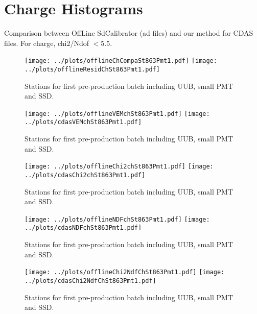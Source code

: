 \documentclass[twoside, final, 10pt]{articleMine}
\begin{document}
\section*{Charge Histograms}
Comparison between OffLine SdCalibrator (ad files) and our method for CDAS files.
For charge, chi2/Ndof $<5.5$.
\clearpage

\begin{figure}[!tbh]
  \centering
  \subfigure
  {
    \texttt{[image: ../plots/offlineChCompaSt863Pmt1.pdf]}
    \texttt{[image: ../plots/offlineResidChSt863Pmt1.pdf]}
  }
  \caption{Stations for first pre-production batch including UUB, small PMT and SSD.}
  \label{figChVemserie}
\end{figure}

\begin{figure}[!tbh]
  \centering
  \subfigure
  {
    \texttt{[image: ../plots/offlineVEMchSt863Pmt1.pdf]}
    \texttt{[image: ../plots/cdasVEMchSt863Pmt1.pdf]}
  }
  \caption{Stations for first pre-production batch including UUB, small PMT and SSD.}
  \label{figChVemserie}
\end{figure}
\clearpage

\begin{figure}[!tbh]
  \centering
  \subfigure
  {
    \texttt{[image: ../plots/offlineChi2chSt863Pmt1.pdf]}
    \texttt{[image: ../plots/cdasChi2chSt863Pmt1.pdf]}
  }
  \caption{Stations for first pre-production batch including UUB, small PMT and SSD.}
  \label{figChChi2serie}
\end{figure}

\begin{figure}[!tbh]
  \centering
  \subfigure
  {
    \texttt{[image: ../plots/offlineNDFchSt863Pmt1.pdf]}
    \texttt{[image: ../plots/cdasNDFchSt863Pmt1.pdf]}
  }
  \caption{Stations for first pre-production batch including UUB, small PMT and SSD.}
  \label{figChNdfserie}
\end{figure}

\begin{figure}[!tbh]
  \centering
  \subfigure
  {
    \texttt{[image: ../plots/offlineChi2NdfChSt863Pmt1.pdf]}
    \texttt{[image: ../plots/cdasChi2NdfChSt863Pmt1.pdf]}
  }
  \caption{Stations for first pre-production batch including UUB, small PMT and SSD.}
  \label{figChChi2Ndfserie}
\end{figure}
\clearpage
\end{document}
